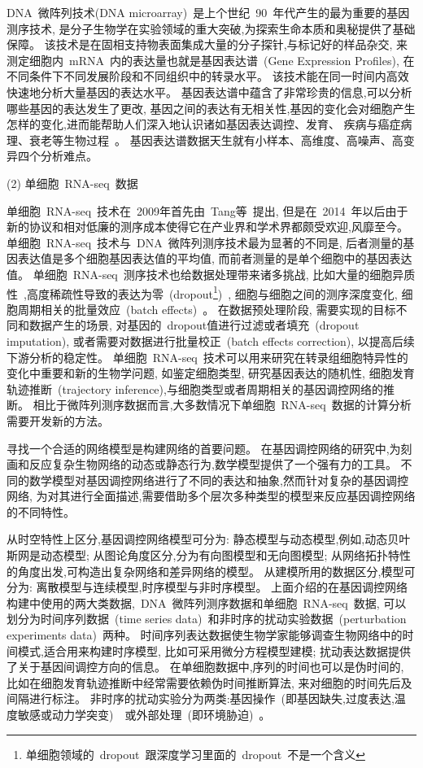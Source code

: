 DNA~微阵列技术(DNA microarray)~是上个世纪~90~年代产生的最为重要的基因测序技术,
是分子生物学在实验领域的重大突破,为探索生命本质和奥秘提供了基础保障。
该技术是在固相支持物表面集成大量的分子探针,与标记好的样品杂交,
来测定细胞内~mRNA~内的表达量也就是基因表达谱~(Gene Expression Profiles),
在不同条件下不同发展阶段和不同组织中的转录水平。
该技术能在同一时间内高效快速地分析大量基因的表达水平。
基因表达谱中蕴含了非常珍贵的信息,可以分析哪些基因的表达发生了更改, 
基因之间的表达有无相关性,基因的变化会对细胞产生怎样的变化,进而能帮助人们深入地认识诸如基因表达调控、发育、
疾病与癌症病理、衰老等生物过程~\cite{chen2005selecting,shen2009new,camargo2008identification}。
基因表达谱数据天生就有小样本、高维度、高噪声、高变异四个分析难点。

(2) 单细胞~RNA-seq~数据

单细胞~RNA-seq~技术在~2009年首先由~Tang等~\cite{tang2009mrna}提出,
但是在~2014~年以后由于新的协议和相对低廉的测序成本使得它在产业界和学术界都颇受欢迎,风靡至今。
单细胞~RNA-seq~技术与~DNA~微阵列测序技术最为显著的不同是,
后者测量的基因表达值是多个细胞基因表达值的平均值,
而前者测量的是单个细胞中的基因表达值。
单细胞~RNA-seq~测序技术也给数据处理带来诸多挑战,
比如大量的细胞异质性~\cite{wagner2016revealing},高度稀疏性导致的表达为零~(dropout\footnote{单细胞领域的~dropout~跟深度学习里面的~dropout~不是一个含义})~\cite{vallejos2017normalizing}, 细胞与细胞之间的测序深度变化, 细胞周期相关的批量效应~(batch effects)~\cite{buettner2015computational}。
在数据预处理阶段, 需要实现的目标不同和数据产生的场景, 对基因的~dropout值进行过滤或者填充~(dropout imputation), 或者需要对数据进行批量校正~(batch effects correction), 以提高后续下游分析的稳定性。
单细胞~RNA-seq~技术可以用来研究在转录组细胞特异性的变化中重要和新的生物学问题,
如鉴定细胞类型, 研究基因表达的随机性, 细胞发育轨迹推断~(trajectory inference),与细胞类型或者周期相关的基因调控网络的推断。
相比于微阵列测序数据而言,大多数情况下单细胞~RNA-seq~数据的计算分析需要开发新的方法。

寻找一个合适的网络模型是构建网络的首要问题。
在基因调控网络的研究中,为刻画和反应复杂生物网络的动态或静态行为,数学模型提供了一个强有力的工具。
不同的数学模型对基因调控网络进行了不同的表达和抽象,然而针对复杂的基因调控网络,
为对其进行全面描述,需要借助多个层次多种类型的模型来反应基因调控网络的不同特性。

从时空特性上区分,基因调控网络模型可分为:
静态模型与动态模型,例如,动态贝叶斯网是动态模型;
从图论角度区分,分为有向图模型和无向图模型;
从网络拓扑特性的角度出发,可构造出复杂网络和差异网络的模型。 
从建模所用的数据区分,模型可分为:
离散模型与连续模型,时序模型与非时序模型。
上面介绍的在基因调控网络构建中使用的两大类数据,~DNA~微阵列测序数据和单细胞~RNA-seq~数据, 
可以划分为时间序列数据~(time series data)~和非时序的扰动实验数据~(perturbation experiments data)~两种。
时间序列表达数据使生物学家能够调查生物网络中的时间模式,适合用来构建时序模型, 比如可采用微分方程模型建模; 
扰动表达数据提供了关于基因间调控方向的信息。
在单细胞数据中,序列的时间也可以是伪时间的, 比如在细胞发育轨迹推断中经常需要依赖伪时间推断算法, 来对细胞的时间先后及间隔进行标注。
非时序的扰动实验分为两类:基因操作~(即基因缺失,过度表达,温度敏感或动力学突变)~\cite{holstege1998dissecting}~或外部处理~(即环境胁迫)~\cite{gasch2000genomic}。

